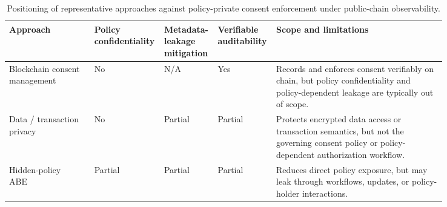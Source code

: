 \begin{table}[htbp]
	\centering
	\caption{Positioning of representative approaches against policy-private consent
		enforcement under public-chain observability.}
	\label{tab:related-work-gap} \footnotesize
	\begin{tabular}{@{}>{\raggedright\arraybackslash}p{0.19\linewidth}>{\raggedright\arraybackslash}p{0.09\linewidth}>{\raggedright\arraybackslash}p{0.09\linewidth}>{\raggedright\arraybackslash}p{0.09\linewidth}p{0.38\linewidth}@{}}
		\hline
		\textbf{Approach}                                                                                                                                     & \textbf{Policy confidentiality} & \textbf{Metadata-leakage mitigation} & \textbf{Verifiable auditability} & \textbf{Scope and limitations}                                                                                                                                                                \\
		\hline
		Blockchain consent management~\cite{kakarlapudi2021systematic,welzel2025enabling}                                                                     & No                              & N/A                                  & Yes                              & Records and enforces consent verifiably on chain, but policy confidentiality and policy-dependent leakage are typically out of scope.                                                         \\
		Data / transaction privacy~\cite{bethencourt2007ciphertext,ateniese2006improved,hu2023access,sasson2014zerocash,rondelet2019zeth,williamson2018aztec} & No                              & Partial                              & Partial                          & Protects encrypted data access or transaction semantics, but not the governing consent policy or policy-dependent authorization workflow.                                                     \\
		Hidden-policy ABE~\cite{yang2024hamed,ding2026badsabe}                                                                                                & Partial                         & Partial                              & Partial                          & Reduces direct policy exposure, but may leak through workflows, updates, or policy-holder interactions.                                                                                       \\

\end{tabular}
\end{table}
